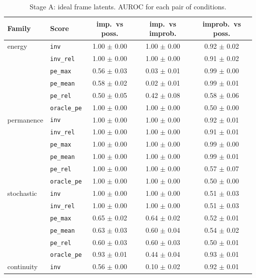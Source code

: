 \begin{table}[t]\centering\small
\caption{Stage A: ideal frame latents. AUROC for each pair of conditions.}\label{tab:stageA}
\begin{tabular}{llccc}\toprule
Family & Score & imp.\ vs poss. & imp.\ vs improb. & improb.\ vs poss.\\\midrule
energy & \texttt{inv} & 1.00 $\pm$ 0.00 & 1.00 $\pm$ 0.00 & 0.92 $\pm$ 0.02\\
 & \texttt{inv\_rel} & 1.00 $\pm$ 0.00 & 1.00 $\pm$ 0.00 & 0.91 $\pm$ 0.02\\
 & \texttt{pe\_max} & 0.56 $\pm$ 0.03 & 0.03 $\pm$ 0.01 & 0.99 $\pm$ 0.00\\
 & \texttt{pe\_mean} & 0.58 $\pm$ 0.02 & 0.02 $\pm$ 0.01 & 0.99 $\pm$ 0.01\\
 & \texttt{pe\_rel} & 0.50 $\pm$ 0.05 & 0.42 $\pm$ 0.08 & 0.58 $\pm$ 0.06\\
 & \texttt{oracle\_pe} & 1.00 $\pm$ 0.00 & 1.00 $\pm$ 0.00 & 0.50 $\pm$ 0.00\\
\midrule
permanence & \texttt{inv} & 1.00 $\pm$ 0.00 & 1.00 $\pm$ 0.00 & 0.92 $\pm$ 0.01\\
 & \texttt{inv\_rel} & 1.00 $\pm$ 0.00 & 1.00 $\pm$ 0.00 & 0.91 $\pm$ 0.01\\
 & \texttt{pe\_max} & 1.00 $\pm$ 0.00 & 1.00 $\pm$ 0.00 & 0.99 $\pm$ 0.00\\
 & \texttt{pe\_mean} & 1.00 $\pm$ 0.00 & 1.00 $\pm$ 0.00 & 0.99 $\pm$ 0.01\\
 & \texttt{pe\_rel} & 1.00 $\pm$ 0.00 & 1.00 $\pm$ 0.00 & 0.57 $\pm$ 0.07\\
 & \texttt{oracle\_pe} & 1.00 $\pm$ 0.00 & 1.00 $\pm$ 0.00 & 0.50 $\pm$ 0.00\\
\midrule
stochastic & \texttt{inv} & 1.00 $\pm$ 0.00 & 1.00 $\pm$ 0.00 & 0.51 $\pm$ 0.03\\
 & \texttt{inv\_rel} & 1.00 $\pm$ 0.00 & 1.00 $\pm$ 0.00 & 0.51 $\pm$ 0.03\\
 & \texttt{pe\_max} & 0.65 $\pm$ 0.02 & 0.64 $\pm$ 0.02 & 0.52 $\pm$ 0.01\\
 & \texttt{pe\_mean} & 0.63 $\pm$ 0.03 & 0.60 $\pm$ 0.04 & 0.54 $\pm$ 0.02\\
 & \texttt{pe\_rel} & 0.60 $\pm$ 0.03 & 0.60 $\pm$ 0.03 & 0.50 $\pm$ 0.01\\
 & \texttt{oracle\_pe} & 0.93 $\pm$ 0.01 & 0.44 $\pm$ 0.04 & 0.93 $\pm$ 0.01\\
\midrule
continuity & \texttt{inv} & 0.56 $\pm$ 0.00 & 0.10 $\pm$ 0.02 & 0.92 $\pm$ 0.01\\

\end{tabular}
\end{table}
